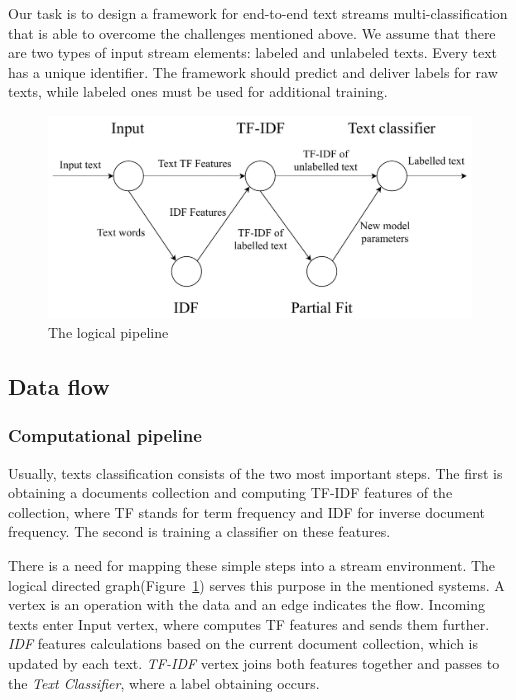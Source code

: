 

Our task is to design a framework for end-to-end text streams multi-classification that is able to overcome the challenges mentioned above. We assume that there are two types of input stream elements: labeled and unlabeled texts. Every text has a unique identifier. The framework should predict and deliver labels for raw texts, while labeled ones must be used for additional training.

\begin{figure}[htbp]
  \centering
  \includegraphics[scale=0.48]{pics/logical-graph}
  \caption{The logical pipeline}
  \label {logical_graph}
\end{figure}

\subsection{Data flow \label{DF}}

\subsubsection{Computational pipeline}

Usually, texts classification consists of the two most important steps. The first is obtaining a documents collection and computing TF-IDF features of the collection, where TF stands for term frequency and IDF for inverse document frequency. The second is training a classifier on these features.

There is a need for mapping these simple steps into a stream environment. The logical directed graph(Figure~\ref{logical_graph}) serves this purpose in the mentioned systems. A vertex is an operation with the data and an edge indicates the flow. Incoming texts enter Input vertex, where computes TF features and sends them further. {\em IDF} features calculations based on the current document collection, which is updated by each text. {\em TF-IDF} vertex joins both features together and passes to the {\em Text Classifier}, where a label obtaining occurs.

